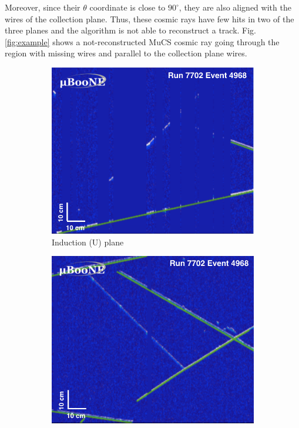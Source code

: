 \documentclass[a4paper]{scrartcl}
\begin{document}
Moreover, since their $\theta$ coordinate is close to $90^\circ$, they are also aligned with the wires of the collection plane. Thus, these cosmic rays have few hits in two of the three planes and the algorithm is not able to reconstruct a track. Fig. \ref{fig:example} shows a not-reconstructed MuCS cosmic ray going through the region with missing wires and parallel to the collection plane wires.

\begin{figure}[htbp]
  \begin{center}
    \begin{subfigure}{0.3\textwidth}
      \includegraphics[width=\linewidth]{figures/u.png}
      \caption{Induction (U) plane} \label{fig:u}
    \end{subfigure}
    \begin{subfigure}{0.3\textwidth}
      \includegraphics[width=\linewidth]{figures/v.png}

\end{subfigure}
\end{center}
\end{figure}
\end{document}
